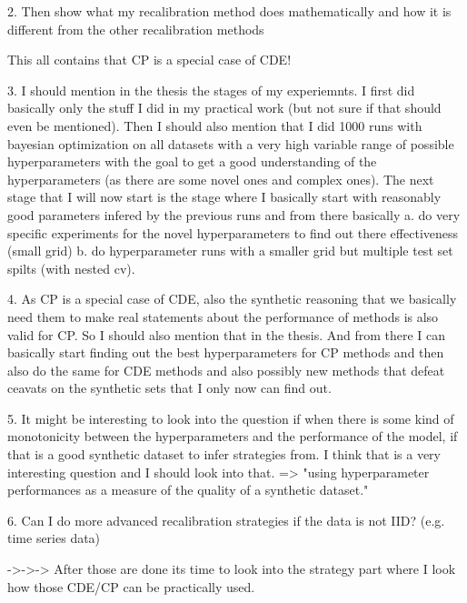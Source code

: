 2. Then show what my recalibration method does mathematically and how it is
different from the other recalibration methods

This all contains that CP is a special case of CDE!

3. I should mention in the thesis the stages of my experiemnts. I first did
basically only the stuff I did in my practical work (but not sure if that
should even be mentioned). Then I should also mention that I did 1000 runs with
bayesian optimization on all datasets with a very high variable range of
possible hyperparameters with the goal to get a good understanding of the
hyperparameters (as there are some novel ones and complex ones). The next stage
that I will now start is the stage where I basically start with reasonably good
parameters infered by the previous runs and from there basically a. do very
specific experiments for the novel hyperparameters to find out there
effectiveness (small grid) b. do hyperparameter runs with a smaller grid but
multiple test set spilts (with nested cv).

4. As CP is a special case of CDE, also the synthetic reasoning that we
basically need them to make real statements about the performance of methods is
also valid for CP. So I should also mention that in the thesis. And from there
I can basically start finding out the best hyperparameters for CP methods and
then also do the same for CDE methods and also possibly new methods that defeat
ceavats on the synthetic sets that I only now can find out.

5. It might be interesting to look into the question if when there is some kind
of monotonicity between the hyperparameters and the performance of the model,
if that is a good synthetic dataset to infer strategies from. I think that is a
very interesting question and I should look into that. => "using hyperparameter
performances as a measure of the quality of a synthetic dataset."

6. Can I do more advanced recalibration strategies if the data is not IID?
(e.g. time series data)

->->-> After those are done its time to look into the strategy part where I
look how those CDE/CP can be practically used.